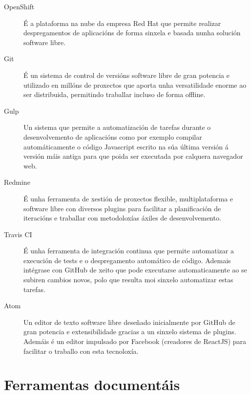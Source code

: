   \begin{description}
   \item [OpenShift] É a plataforma na nube da empresa Red Hat que permite
realizar despregamentos de aplicacións de forma sinxela e basada nunha solución software
libre.
   \item [Git]  É un sistema de control de versións software libre de gran potencia e
utilizado en millóns de proxectos que aporta unha versatilidade enorme ao ser
distribuida, permitindo traballar incluso de forma offline.
   \item [Gulp] Un sistema que permite a automatización de tarefas durante o
desenvolvemento de aplicacións como por exemplo compilar automáticamente o código
Javascript escrito na súa última versión á versión máis antiga para que poida ser
executada por calquera navegador web.
   \item [Redmine] É unha ferramenta de xestión de proxectos flexible, multiplataforma e
software libre con diversos plugins para facilitar a planificación de iteracións e
traballar con metodoloxías áxiles de desenvolvemento.
   \item [Travis CI] É unha ferramenta de integración continua que permite automatizar a
execución de tests e o despregamento automático de código. Ademais intégrase con GitHub de xeito que pode executarse automaticamente ao se subiren cambios novos, polo que resulta moi sinxelo automatizar estas tarefas.
   \item [Atom] Un editor de texto software libre deseñado inicialmente por GitHub de
gran potencia e extensibilidade gracias a un sinxelo sistema de plugins. Ademáis é un
editor impulsado por Facebook (creadores de ReactJS) para facilitar o traballo con esta
tecnoloxía.

  \end{description}

  \section{Ferramentas documentáis}


